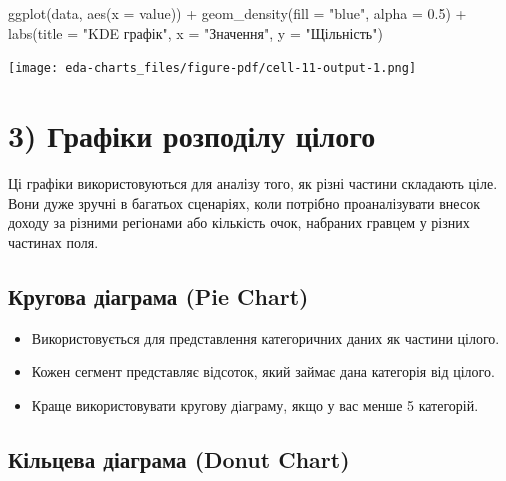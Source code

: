 \documentclass[
  letterpaper,
  DIV=11,
  numbers=noendperiod]{scrreprt}
\newenvironment{Shaded}{\begin{snugshade}}{\end{snugshade}}
\newcommand{\AttributeTok}[1]{\textcolor[rgb]{0.40,0.45,0.13}{#1}}
\newcommand{\FloatTok}[1]{\textcolor[rgb]{0.68,0.00,0.00}{#1}}
\newcommand{\FunctionTok}[1]{\textcolor[rgb]{0.28,0.35,0.67}{#1}}
\newcommand{\NormalTok}[1]{\textcolor[rgb]{0.00,0.23,0.31}{#1}}
\newcommand{\SpecialCharTok}[1]{\textcolor[rgb]{0.37,0.37,0.37}{#1}}
\newcommand{\StringTok}[1]{\textcolor[rgb]{0.13,0.47,0.30}{#1}}
\providecommand{\tightlist}{%
  \setlength{\itemsep}{0pt}\setlength{\parskip}{0pt}}\usepackage{longtable,booktabs,array}
\begin{document}
\begin{Shaded}
\begin{Highlighting}[]
\FunctionTok{ggplot}\NormalTok{(data, }\FunctionTok{aes}\NormalTok{(}\AttributeTok{x =}\NormalTok{ value)) }\SpecialCharTok{+}
  \FunctionTok{geom\_density}\NormalTok{(}\AttributeTok{fill =} \StringTok{"blue"}\NormalTok{, }\AttributeTok{alpha =} \FloatTok{0.5}\NormalTok{) }\SpecialCharTok{+}
  \FunctionTok{labs}\NormalTok{(}\AttributeTok{title =} \StringTok{"KDE графік"}\NormalTok{, }\AttributeTok{x =} \StringTok{"Значення"}\NormalTok{, }\AttributeTok{y =} \StringTok{"Щільність"}\NormalTok{)}
\end{Highlighting}
\end{Shaded}

\texttt{[image: eda-charts\_files/figure-pdf/cell-11-output-1.png]}

\chapter{3) Графіки розподілу
цілого}\label{ux433ux440ux430ux444ux456ux43aux438-ux440ux43eux437ux43fux43eux434ux456ux43bux443-ux446ux456ux43bux43eux433ux43e}

Ці графіки використовуються для аналізу того, як різні частини складають
ціле. Вони дуже зручні в багатьох сценаріях, коли потрібно
проаналізувати внесок доходу за різними регіонами або кількість очок,
набраних гравцем у різних частинах поля.

\section{Кругова діаграма (Pie
Chart)}\label{ux43aux440ux443ux433ux43eux432ux430-ux434ux456ux430ux433ux440ux430ux43cux430-pie-chart}

\begin{itemize}
\tightlist
\item
  Використовується для представлення категоричних даних як частини
  цілого.
\item
  Кожен сегмент представляє відсоток, який займає дана категорія від
  цілого.
\item
  Краще використовувати кругову діаграму, якщо у вас менше 5 категорій.
\end{itemize}

\section{Кільцева діаграма (Donut
Chart)}\label{ux43aux456ux43bux44cux446ux435ux432ux430-ux434ux456ux430ux433ux440ux430ux43cux430-donut-chart}
\end{document}
